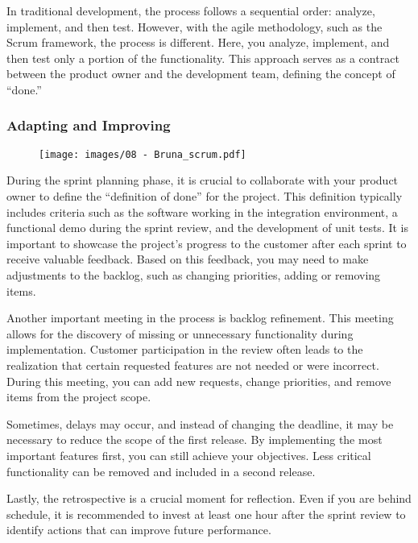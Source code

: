 In traditional development, the process follows a sequential order:
analyze, implement, and then test. However, with the agile methodology,
such as the Scrum framework, the process is different. Here, you
analyze, implement, and then test only a portion of the functionality.
This approach serves as a contract between the product owner and the
development team, defining the concept of ``done.''

\subsubsection{Adapting and Improving}

\begin{figure}[!h]
    \centering
    \texttt{[image: images/08 - Bruna\_scrum.pdf]}
\end{figure}

During the sprint planning phase, it is crucial to collaborate with your
product owner to define the ``definition of done'' for the project. This
definition typically includes criteria such as the software working in
the integration environment, a functional demo during the sprint review,
and the development of unit tests. It is important to showcase the
project's progress to the customer after each sprint to receive valuable
feedback. Based on this feedback, you may need to make adjustments to
the backlog, such as changing priorities, adding or removing items.

Another important meeting in the process is backlog refinement. This
meeting allows for the discovery of missing or unnecessary functionality
during implementation. Customer participation in the review often leads
to the realization that certain requested features are not needed or
were incorrect. During this meeting, you can add new requests, change
priorities, and remove items from the project scope.

Sometimes, delays may occur, and instead of changing the deadline, it
may be necessary to reduce the scope of the first release. By
implementing the most important features first, you can still achieve
your objectives. Less critical functionality can be removed and included
in a second release.

Lastly, the retrospective is a crucial moment for reflection. Even if
you are behind schedule, it is recommended to invest at least one hour
after the sprint review to identify actions that can improve future
performance.

